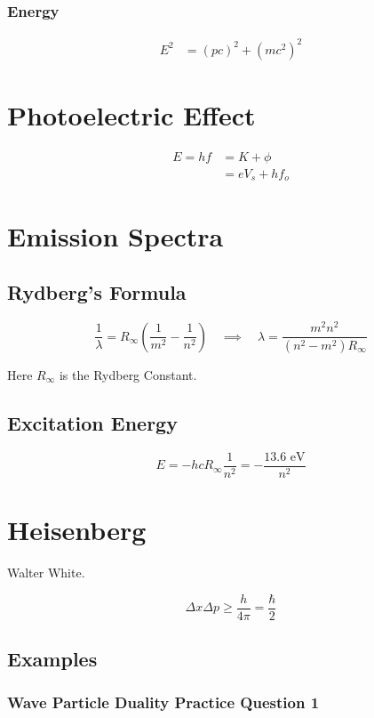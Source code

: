 \documentclass[11pt]{article}
\begin{document}
\subsubsection{Energy}
\begin{align*}
E^2 &= (pc)^2 + (mc^2)^2
\end{align*}


\section{Photoelectric Effect}

\begin{align*}
    E = hf &= K + \phi \\
    &= eV_s + hf_o
\end{align*}

\section{Emission Spectra}
\subsection{Rydberg's Formula}

$$\frac{1}\lambda = R_\infty\left(\frac{1}{m^2} - \frac{1}{n^2} \right) \quad \implies \quad \lambda = \frac{m^2n^2}{(n^2-m^2)R_\infty}$$

Here $R_\infty$ is the Rydberg Constant.

\subsection{Excitation Energy}

$$E = -hcR_\infty \frac{1}{n^2} = -\frac{\text{13.6 eV}}{n^2}$$

\section{Heisenberg}

Walter White.

$$\Delta x \Delta p \geq \frac{h}{4\pi} = \frac{\hbar}{2}$$

\subsection{Examples}

\subsubsection{Wave Particle Duality Practice Question 1}
\end{document}
